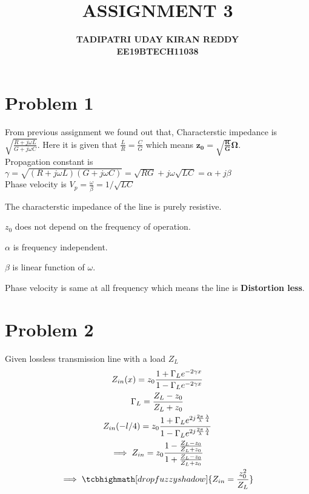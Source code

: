 \documentclass{article}
\begin{document}
\title{{\textbf{ASSIGNMENT 3}}}
\author{\textbf{TADIPATRI UDAY KIRAN REDDY}\\\textbf{EE19BTECH11038}}
\maketitle

\section*{\hfil Problem 1}
From previous assignment we found out that, Characterstic impedance is $\sqrt{\frac{R + j{\omega}L}{G + j{\omega}C}}$. Here it is given that $\frac{L}{R} = \frac{C}{G}$ which means $\mathbf{z_0 = \sqrt{\frac{R}{G}} \si{\ohm}}$.\\
Propagation constant is $\gamma = \sqrt{(R + j\omega L)(G + j \omega C)} = \sqrt{RG} + j\omega \sqrt{LC} = \alpha + j\beta$\\
Phase velocity is $V_p = \frac{\omega}{\beta} = 1/\sqrt{LC}$\\
\begin{list}{•}{\textbf{Observations}}
\item The characterstic impedance of the line is purely resistive.
\item $z_0$ does not depend on the frequency of operation.
\item $\alpha$ is frequency independent.
\item $\beta$ is linear function of $\omega$.
\item Phase velocity is same at all frequency which means the line is \textbf{Distortion less}.
\end{list}

\section*{\hfil Problem 2}
Given lossless transmission line with a load $Z_L$
\begin{gather*}
Z_{in}(x) = z_0\frac{1 + \Gamma _Le^{-2\gamma x}}{1 - \Gamma _Le^{-2\gamma x}} \\
\Gamma _L = \frac{Z_L - z_0}{Z_L + z_0}\\
Z_{in}(-l/4) = z_0\frac{1 + \Gamma _Le^{2 j\frac{2 \pi}{\lambda}\frac{\lambda}{4}}}{1 - \Gamma _Le^{2 j\frac{2 \pi}{\lambda}\frac{\lambda}{4}}}\\
\implies Z_{in} = z_0 \frac{1 - \frac{Z_L - z_0}{Z_L + z_0}}{1 + \frac{Z_L - z_0}{Z_L + z_0}}\\
\implies \tcbhighmath[drop fuzzy shadow]{Z_{in} = \frac{z_0^2}{Z_L}} 
\end{gather*}
\end{document}
